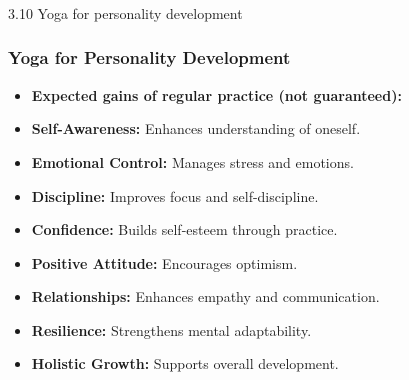 \begin{frame}[fragile]\frametitle{}
\begin{center}
{\Large 3.10 Yoga for personality development}
\end{center}
\end{frame}

\begin{frame}[fragile]\frametitle{Yoga for Personality Development}

    \begin{itemize}
        \item \textbf{Expected gains of regular practice (not guaranteed):}
        \item \textbf{Self-Awareness:} Enhances understanding of oneself.
        \item \textbf{Emotional Control:} Manages stress and emotions.
        \item \textbf{Discipline:} Improves focus and self-discipline.
        \item \textbf{Confidence:} Builds self-esteem through practice.
        \item \textbf{Positive Attitude:} Encourages optimism.
        \item \textbf{Relationships:} Enhances empathy and communication.
        \item \textbf{Resilience:} Strengthens mental adaptability.
        \item \textbf{Holistic Growth:} Supports overall development.
    \end{itemize}

\end{frame}


